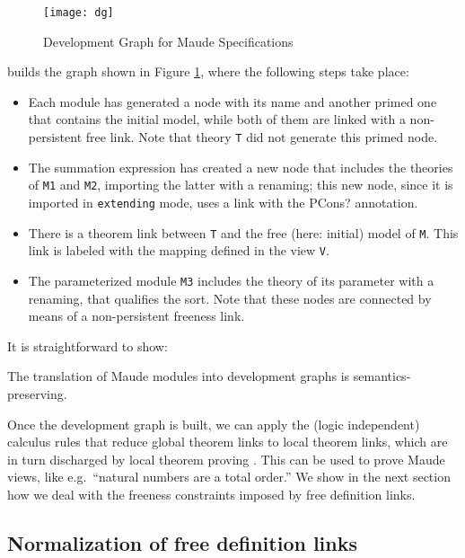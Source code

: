 \begin{figure}[t]
\begin{center}
\texttt{[image: dg]}
\caption{Development Graph for Maude Specifications\label{fig:dg}}
\end{center}
\end{figure}

\noindent \Hets builds the graph shown in Figure \ref{fig:dg},
where the following steps take place:
\begin{itemize}
\item Each module has generated a node with its name and
another primed one that contains the initial model, while both of them
are linked with a non-persistent free link. Note that theory \verb"T" did not
generate this primed node.
\item The summation expression has created a new node that includes the theories
of \verb"M1" and \verb"M2", importing the latter with a renaming; this new
node, since it is imported in \verb"extending" mode, uses a link with the
\textsf{PCons?} annotation.
\item There is a theorem link between \verb"T" and the free (here: initial) model of
\verb"M". This link is labeled with the mapping defined in the view \verb"V".
\item The parameterized module \verb"M3" includes the theory of its parameter
with a renaming, that qualifies the sort. Note that these nodes are connected
by means of a non-persistent freeness link.
\end{itemize}

It is straightforward to show:
\begin{theorem}
The translation of Maude modules into development graphs is
semantics-preserving. %
\end{theorem}

Once the development graph is built, we can apply the (logic
independent) calculus rules that reduce global theorem links to local
theorem links, which are in turn discharged by local theorem proving
\cite{MAH-05-a}.  This can be used to prove Maude views, like e.g.\
``natural numbers are a total order.''  We show in the next
section how we deal with the freeness constraints imposed by free 
definition links.

\subsection{Normalization of free definition links}
\label{sec:free}

